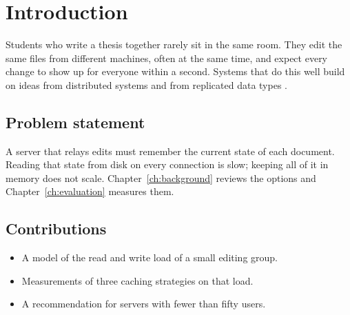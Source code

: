 \chapter{Introduction}
\label{ch:introduction}

Students who write a thesis together rarely sit in the same room. They edit
the same files from different machines, often at the same time, and expect
every change to show up for everyone within a second. Systems that do this
well build on ideas from distributed systems \cite{lamport78} and from
replicated data types \cite{shapiro11}.

\section{Problem statement}
A server that relays edits must remember the current state of each document.
Reading that state from disk on every connection is slow; keeping all of it
in memory does not scale. Chapter~\ref{ch:background} reviews the options and
Chapter~\ref{ch:evaluation} measures them.

\section{Contributions}
\begin{itemize}
  \item A model of the read and write load of a small editing group.
  \item Measurements of three caching strategies on that load.
  \item A recommendation for servers with fewer than fifty users.
\end{itemize}
